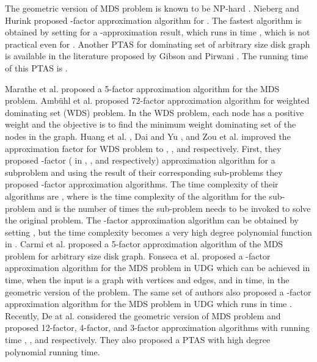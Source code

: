 \documentclass[a4paper,11pt]{article}
\begin{document}
The geometric version of MDS problem is known to be NP-hard \cite{CCJ90}. 
Nieberg and Hurink \cite{NH06} proposed -factor approximation algorithm 
for . The fastest algorithm is obtained by setting  for a
-approximation result, which runs in  time \cite{DDCN13}, which is not 
practical even for . Another PTAS for dominating set of arbitrary size disk graph is available 
in the literature proposed by Gibson and Pirwani \cite{GP10}. The running time of this PTAS is 
. 

Marathe et al. \cite{MBIRR95} proposed a 5-factor approximation algorithm for the MDS problem. 
Amb{\"u}hl et al. \cite{AEMN06} proposed 72-factor approximation algorithm for weighted dominating 
set (WDS) problem. In the WDS problem, each node has a positive weight and the objective is to find 
the minimum weight dominating set of the nodes in the graph. Huang et al. \cite{HGZW08}, Dai and Yu 
\cite{DY09}, and  Zou et al. \cite{ZWXLDWW11} improved the approximation factor for WDS problem to 
, , and  respectively. First, they proposed -factor 
( in \cite{HGZW08}, \cite{DY09}, and \cite{ZWXLDWW11} respectively) approximation 
algorithm for a subproblem and using the result of their corresponding sub-problems they proposed 
-factor approximation algorithms. The time complexity of their algorithms 
are , where  is the time complexity of the algorithm 
for the sub-problem and  is the number 
of times the sub-problem needs to be invoked to solve the original problem. The -factor 
approximation algorithm can be obtained by setting , but the time complexity becomes a
very high degree polynomial function in . Carmi et al. \cite{CKL08} proposed a 5-factor approximation 
algorithm of the MDS problem for arbitrary size disk graph. Fonseca et al. \cite{FFSM12} proposed a 
-factor approximation algorithm for the MDS problem in UDG which can be achieved in  
time, when the input is a graph with  vertices and  edges, and in  time, in the geometric 
version of the problem. The same set of authors also proposed a -factor approximation algorithm 
for the MDS problem in UDG which runs in  time \cite{FFSM12-1}. Recently, De at al. \cite{DDCN13} 
considered the geometric version of MDS problem and proposed 12-factor, 4-factor, and 3-factor approximation 
algorithms with running time , , and  respectively. They also 
proposed a PTAS with high degree polynomial running time. 
\end{document}
